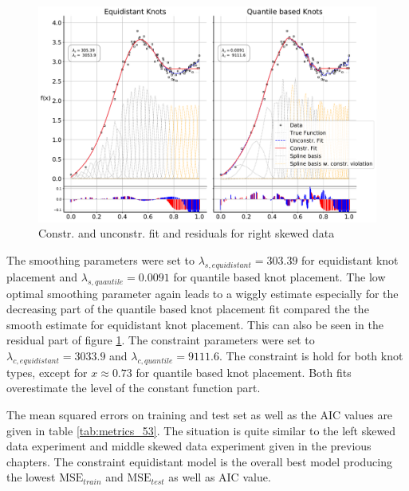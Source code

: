\documentclass[10pt,a4paper]{article}
\begin{document}
\begin{figure}[H]
	\centering
	\includegraphics[width=\columnwidth]{../thesisplots/exp_beta/exp_right_skewed_data_ndata_250_rseed_1.pdf}
	\caption{Constr. and unconstr. fit and residuals for right skewed data}
	\label{fig:fit_right_skew_250}
\end{figure}

The smoothing parameters were set to $\lambda_{s, equidistant} = 303.39$ for equidistant knot placement and $\lambda_{s, quantile} = 0.0091$ for quantile based knot placement. The low optimal smoothing parameter again leads to a wiggly estimate  especially for the decreasing part of the quantile based knot placement fit compared the the smooth estimate for equidistant knot placement. This can also be seen in the residual part of figure \ref{fig:fit_right_skew_250}. The constraint parameters were set to $\lambda_{c, equidistant} = 3033.9$ and $\lambda_{c, quantile} = 9111.6$. The constraint is hold for both knot types, except for $x \approx 0.73$ for quantile based knot placement. Both fits overestimate the level of the constant function part.

The mean squared errors on training and test set as well as the AIC values are given in table \ref{tab:metrics_53}. The situation is quite similar to the left skewed data experiment and middle skewed data experiment given in the previous chapters. The constraint equidistant model is the overall best model producing the lowest $\text{MSE}_{train}$ and $\text{MSE}_{test}$ as well as AIC value.
\end{document}
